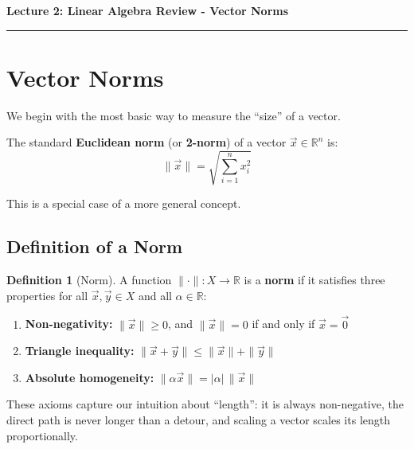 \documentclass[10pt, twocolumn]{article}
\theoremstyle{definition}
\newtheorem{definition}{Definition}
\theoremstyle{plain}
\newcommand{\RR}{\mathbb{R}}
\begin{document}
\noindent
\begin{minipage}{\linewidth}
    \centering
    \textbf{\Large Lecture 2: Linear Algebra Review - Vector Norms} \\[0.5em]
    \hrule
\end{minipage}
\vspace{1em}

\section{Vector Norms}

We begin with the most basic way to measure the ``size'' of a vector.

The standard \textbf{Euclidean norm} (or \textbf{2-norm}) of a vector $\vec{x} \in \RR^n$ is:
\[
    \|\vec{x}\| = \sqrt{\sum_{i=1}^{n} x_i^2}
\]

This is a special case of a more general concept.

\subsection{Definition of a Norm}

\begin{tcolorbox}
\begin{definition}[Norm]
A function $\|\cdot\|: X \to \RR$ is a \textbf{norm} if it satisfies three properties for all $\vec{x}, \vec{y} \in X$ and all $\alpha \in \RR$:
\begin{enumerate}
    \item \textbf{Non-negativity:} $\|\vec{x}\| \ge 0$, and $\|\vec{x}\| = 0$ if and only if $\vec{x} = \vec{0}$
    \item \textbf{Triangle inequality:} $\|\vec{x} + \vec{y}\| \le \|\vec{x}\| + \|\vec{y}\|$
    \item \textbf{Absolute homogeneity:} $\|\alpha \vec{x}\| = |\alpha| \, \|\vec{x}\|$
\end{enumerate}
\end{definition}
\end{tcolorbox}

These axioms capture our intuition about ``length'': it is always non-negative, the direct path is never longer than a detour, and scaling a vector scales its length proportionally.
\end{document}
